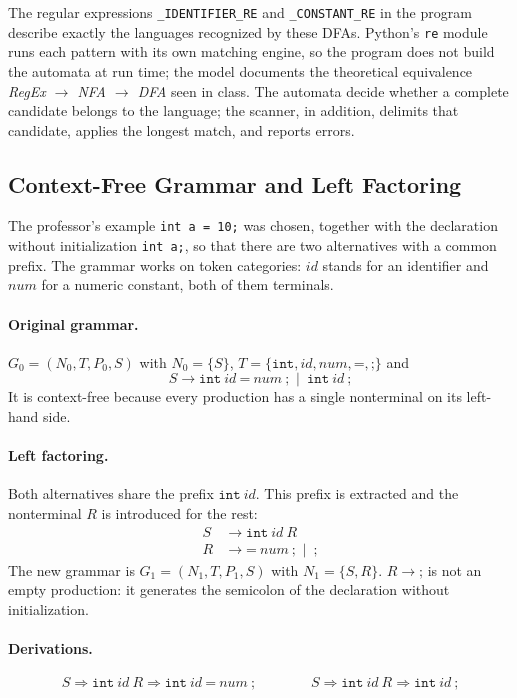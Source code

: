 \documentclass[11pt,letterpaper]{article}
\newcommand{\tok}[1]{\texttt{#1}}
\begin{document}
The regular expressions \tok{\_IDENTIFIER\_RE} and \tok{\_CONSTANT\_RE} in the
program describe exactly the languages recognized by these DFAs. Python's
\tok{re} module runs each pattern with its own matching engine, so the program
does not build the automata at run time; the model documents the theoretical
equivalence \emph{RegEx $\rightarrow$ NFA $\rightarrow$ DFA} seen in class.
The automata decide whether a complete candidate belongs to the language; the
scanner, in addition, delimits that candidate, applies the longest match, and
reports errors.

\subsection{Context-Free Grammar and Left Factoring}
\label{sec:cfg}

The professor's example \tok{int a = 10;} was chosen, together with the
declaration without initialization \tok{int a;}, so that there are two
alternatives with a common prefix. The grammar works on token categories:
$id$ stands for an identifier and $num$ for a numeric constant, both of them
terminals.

\paragraph{Original grammar.} $G_0=(N_0,T,P_0,S)$ with $N_0=\{S\}$,
$T=\{\texttt{int},id,num,\texttt{=},\texttt{;}\}$ and
\[
S\to\texttt{int}\ id\ \texttt{=}\ num\ \texttt{;}\ \mid\ \texttt{int}\ id\ \texttt{;}
\]
It is context-free because every production has a single nonterminal on its
left-hand side.

\paragraph{Left factoring.} Both alternatives share the prefix
$\texttt{int}\ id$. This prefix is extracted and the nonterminal $R$ is
introduced for the rest:
\[
\begin{aligned}
S &\to \texttt{int}\ id\ R\\
R &\to \texttt{=}\ num\ \texttt{;}\ \mid\ \texttt{;}
\end{aligned}
\]
The new grammar is $G_1=(N_1,T,P_1,S)$ with $N_1=\{S,R\}$. $R\to\texttt{;}$ is
not an empty production: it generates the semicolon of the declaration
without initialization.

\paragraph{Derivations.}
\[
S\Rightarrow\texttt{int}\ id\ R\Rightarrow\texttt{int}\ id\ \texttt{=}\ num\ \texttt{;}
\qquad\qquad
S\Rightarrow\texttt{int}\ id\ R\Rightarrow\texttt{int}\ id\ \texttt{;}
\]
\end{document}
